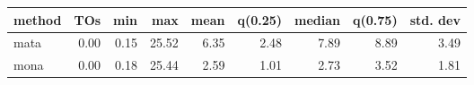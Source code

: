 \begin{tabular}{lrrrrrrrr}
\hline
 method   &   TOs &   min &   max &   mean &   q(0.25) &   median &   q(0.75) &   std. dev \\
\hline
 mata     &  0.00 &  0.15 & 25.52 &   6.35 &      2.48 &     7.89 &      8.89 &       3.49 \\
 mona     &  0.00 &  0.18 & 25.44 &   2.59 &      1.01 &     2.73 &      3.52 &       1.81 \\
\hline
\end{tabular}
